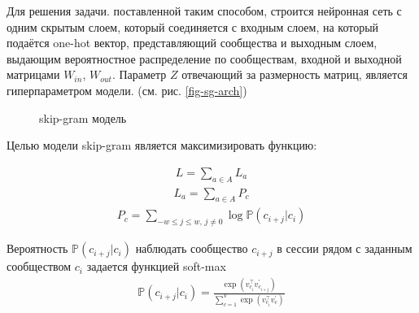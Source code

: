 \documentclass[times,specification,annotation]{itmo-student-thesis}
\begin{document}
Для решения задачи. поставленной таким способом, строится нейронная сеть с одним скрытым слоем, который соединяется с входным слоем, на который подаётся one-hot вектор, представляющий сообщества и выходным слоем, выдающим вероятностное распределение по сообществам, входной и выходной матрицами $W_{in}$, $W_{out}$. Параметр $Z$ отвечающий за размерность матриц, является гиперпараметром модели. (см. рис. \ref {fig-sg-arch})

\begin{figure}[!h]
\caption{skip-gram модель}\label{fig-sg}
\centering
{}
\end{figure}

Целью модели skip-gram является максимизировать функцию: 

\begin{align}
L = \sum_{a \in A}L_a
\label{eq1}
\end{align}
\begin{align}
L_a = \sum_{a \in A}P_c
\label{eq-a}
\end{align}
\begin{align}
P_c = \sum_{-w \leq j \leq w,\, j \ne 0}\log \mathbb{P}(c_{i + j} | c_i)  
\label{eq-opt-ses}
\end{align}

Вероятность $\mathbb{P}(c_{i + j} | c_i)$ наблюдать сообщество $c_{i + j}$ в сессии рядом с заданным сообществом $c_i$ задается функцией soft-max 
\begin{align}
\mathbb{P}(c_{i + j} | c_i) = \frac{\exp(v_{c_i}^\top v_{c_{i + j}}^{'})}{\sum_{c = 1}^{V}\exp(v_{c_i}^\top v_{c}^{'})}
\label{eq-softmax}
\end{align}
\end{document}
